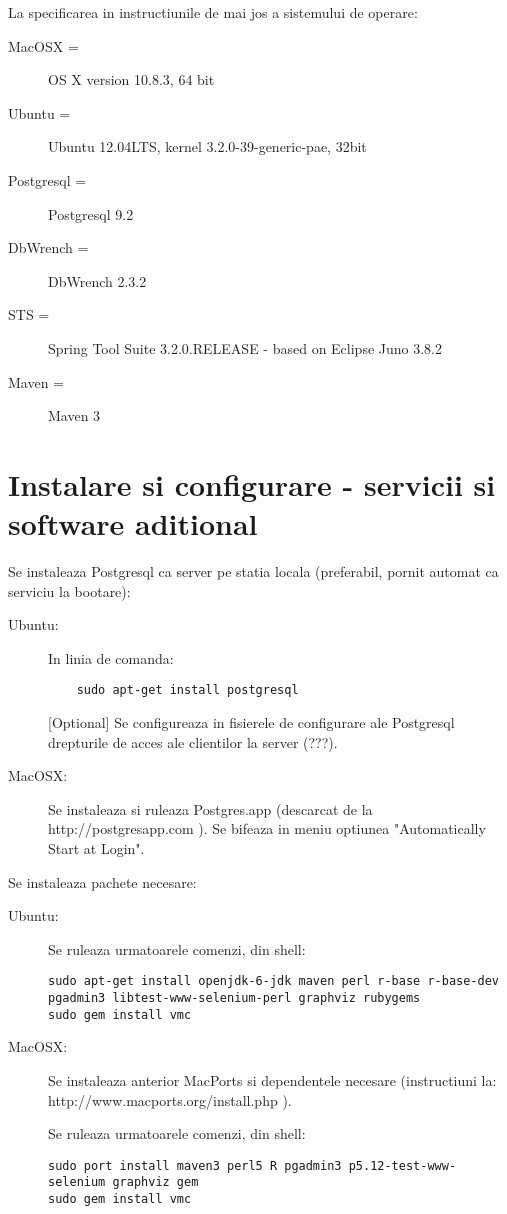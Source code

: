 La specificarea in instructiunile de mai jos a sistemului de operare:
\begin{description} 
\item [MacOSX =] OS X version 10.8.3, 64 bit
\item [Ubuntu =] Ubuntu 12.04LTS, kernel 3.2.0-39-generic-pae, 32bit
\item [Postgresql =] Postgresql 9.2
\item [DbWrench =] DbWrench 2.3.2
\item [STS =] Spring Tool Suite 3.2.0.RELEASE - based on Eclipse Juno 3.8.2
\item [Maven =] Maven 3
\end{description}

\section{Instalare si configurare - servicii si software aditional}

Se instaleaza Postgresql ca server pe statia locala (preferabil, pornit automat ca serviciu la bootare):
\begin{description}
\item[Ubuntu:] In linia de comanda:
\begin{lstlisting}
	sudo apt-get install postgresql
\end{lstlisting}

[Optional] Se configureaza in fisierele de configurare ale Postgresql drepturile
de acces ale clientilor la server (???).

\item [MacOSX:] 
Se instaleaza si ruleaza Postgres.app (descarcat de la http://postgresapp.com ).
Se bifeaza in meniu optiunea "Automatically Start at Login".
\end{description}

Se instaleaza pachete necesare:
\begin{description}
\item[Ubuntu:]
Se ruleaza urmatoarele comenzi, din shell:
\begin{lstlisting}[breaklines=true]
sudo apt-get install openjdk-6-jdk maven perl r-base r-base-dev pgadmin3 libtest-www-selenium-perl graphviz rubygems
sudo gem install vmc
\end{lstlisting}
\item[MacOSX:]
Se instaleaza anterior MacPorts si dependentele necesare (instructiuni la: http://www.macports.org/install.php ).

Se ruleaza urmatoarele comenzi, din shell:
\begin{lstlisting}[breaklines=true]
sudo port install maven3 perl5 R pgadmin3 p5.12-test-www-selenium graphviz gem
sudo gem install vmc
\end{lstlisting}
\end{description}

